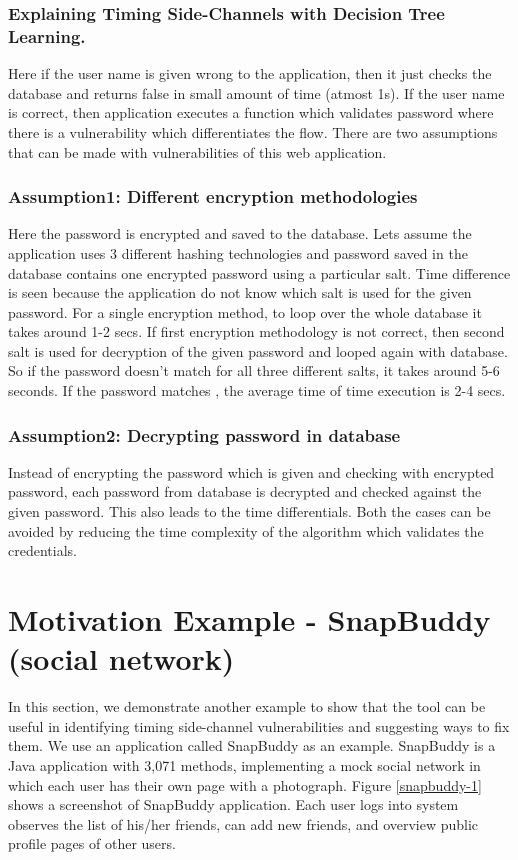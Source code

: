 \documentclass{article}
\begin{document}
\subsubsection*{Explaining Timing Side-Channels with Decision Tree Learning.}
Here if the user name is given wrong to the application, then it just checks the database and returns false in small amount of time (atmost 1s). If the user name is correct, then application executes a function which validates password where there is a vulnerability which differentiates the flow. There are two assumptions that can be made with vulnerabilities of this web application.

\subsubsection{Assumption1: Different encryption methodologies }
Here the password is encrypted and saved to the database. Lets assume the application uses 3 different hashing technologies and password saved in the database contains one encrypted password using a particular salt. Time difference is seen because the application do not know which salt is used for the given password. For a single encryption method, to loop over the whole database it takes around 1-2 secs. If first encryption methodology is not correct, then second salt is used for decryption of the given password and looped again with database. So if the password doesn't match for all three different salts, it takes around 5-6 seconds. If the password matches , the average time of time execution is 2-4 secs.

\subsubsection{Assumption2: Decrypting password in database}
Instead of encrypting the password which is given and checking with encrypted password, each password from database is decrypted and checked against the given password. This also leads to the time differentials. 
\newline \newline
Both the cases can be avoided by reducing the time complexity of the algorithm which validates the credentials. 

\section{Motivation Example - SnapBuddy (social network)}
In this section, we demonstrate another example to show that the tool can be useful in
identifying timing side-channel vulnerabilities
and suggesting ways to fix them.
We use an application called
SnapBuddy as an example. SnapBuddy is a Java application with 3,071 methods,
implementing a mock social network in which
each user has their own page with a photograph. Figure \ref{snapbuddy-1} shows
a screenshot of SnapBuddy application. Each user logs into system observes the
list of his/her friends, can add new friends, and overview public profile pages of
other users. 
\end{document}

